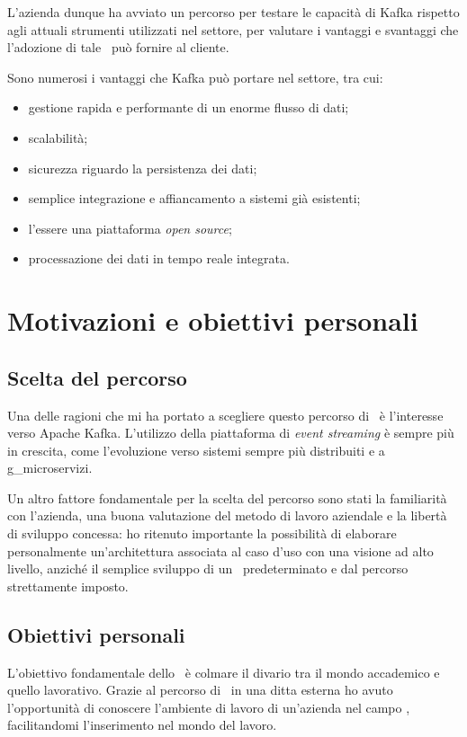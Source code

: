 L'azienda dunque ha avviato un percorso per testare le capacità di Kafka rispetto agli attuali strumenti utilizzati nel settore, per valutare i vantaggi e svantaggi che l'adozione di tale \software\ può fornire al cliente.

\noindent
Sono numerosi i vantaggi che Kafka può portare nel settore, tra cui:
\begin{itemize}
  \item gestione rapida e performante di un enorme flusso di dati;
  \item scalabilità;
  \item sicurezza riguardo la persistenza dei dati;
  \item semplice integrazione e affiancamento a sistemi già esistenti;
  \item l'essere una piattaforma \textit{open source};
  \item processazione dei dati in tempo reale integrata.
\end{itemize}


\section{Motivazioni e obiettivi personali}

\subsection{Scelta del percorso}

Una delle ragioni che mi ha portato a scegliere questo percorso di \stage\ è l'interesse verso Apache Kafka.
L'utilizzo della piattaforma di \textit{event streaming} è sempre più in crescita, come l'evoluzione verso sistemi sempre più distribuiti e a \gls{g_microservizi}.

Un altro fattore fondamentale per la scelta del percorso sono stati la familiarità con l'azienda, una buona valutazione del metodo di lavoro aziendale e la libertà di sviluppo concessa: ho ritenuto importante la possibilità di elaborare personalmente un'architettura associata al caso d'uso con una visione ad alto livello, anziché il semplice sviluppo di un \software\ predeterminato e dal percorso strettamente imposto.

\subsection{Obiettivi personali}
L'obiettivo fondamentale dello \stage\ è colmare il divario tra il mondo accademico e quello lavorativo.
Grazie al percorso di \stage\ in una ditta esterna ho avuto l'opportunità di conoscere l'ambiente di lavoro di un'azienda nel campo , facilitandomi l'inserimento nel mondo del lavoro.


